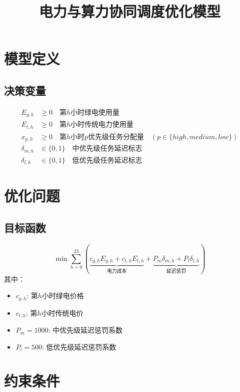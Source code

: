 \documentclass{article}
\title{电力与算力协同调度优化模型}
\author{}
\date{}
\begin{document}
\maketitle

\section{模型定义}

\subsection{决策变量}
\begin{align*}
E_{g,h} &\geq 0 \quad \text{第$h$小时绿电使用量} \\
E_{t,h} &\geq 0 \quad \text{第$h$小时传统电力使用量} \\
x_{p,h} &\geq 0 \quad \text{第$h$小时$p$优先级任务分配量} \quad (p \in \{high, medium, low\}) \\
\delta_{m,h} &\in \{0,1\} \quad \text{中优先级任务延迟标志} \\
\delta_{l,h} &\in \{0,1\} \quad \text{低优先级任务延迟标志}
\end{align*}

\section{优化问题}

\subsection{目标函数}
\begin{equation}
\min \sum_{h=0}^{23} \left(
\underbrace{c_{g,h}E_{g,h} + c_{t,h}E_{t,h}}_{\text{电力成本}} +
\underbrace{P_m \delta_{m,h} + P_l \delta_{l,h}}_{\text{延迟惩罚}}
\right)
\end{equation}
其中：
\begin{itemize}
\item $c_{g,h}$: 第$h$小时绿电价格
\item $c_{t,h}$: 第$h$小时传统电价
\item $P_m=1000$: 中优先级延迟惩罚系数
\item $P_l=500$: 低优先级延迟惩罚系数
\end{itemize}

\section{约束条件}
\end{document}

